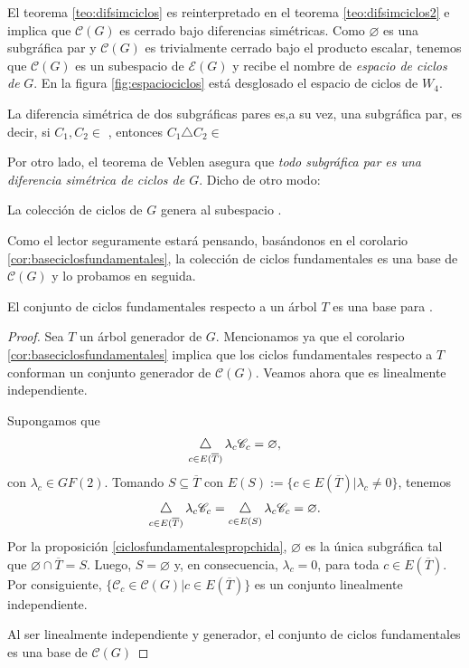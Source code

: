 El teorema \ref{teo:difsimciclos} es reinterpretado en el teorema \ref{teo:difsimciclos2} e implica que $\mathcal{C}(G)$ es cerrado bajo diferencias simétricas. Como $\varnothing$ es una subgráfica par y $\mathcal{C}(G)$ es trivialmente cerrado bajo el producto escalar, tenemos que $\mathcal{C}(G)$ es un subespacio de $\mathcal{E}(G)$ y recibe el nombre de \textit{espacio de ciclos de} $G$. En la figura \ref{fig:espaciociclos} está desglosado el espacio de ciclos de $W_{4}$.

\begin{teo} \label{teo:difsimciclos2}
La diferencia simétrica de dos subgráficas pares es,a su vez, una subgráfica par, es decir, si $C_{1},C_{2} \in$ \cyclet, entonces $C_{1} \triangle C_{2}\in$ \cyclet
\end{teo}

Por otro lado, el teorema de Veblen asegura que \textit{todo subgráfica par es una diferencia simétrica de ciclos de $G$}. Dicho de otro modo:

\begin{teo}
La colección de ciclos de $G$ genera al subespacio \cyclet.
\end{teo}

Como el lector seguramente estará pensando, basándonos en el  corolario \ref{cor:baseciclosfundamentales}, la colección de ciclos fundamentales es una base de $\mathcal{C}(G)$ y lo probamos en seguida.

\begin{teo}
El conjunto de ciclos fundamentales respecto a un árbol $T$ es una base para \cyclet.
 \end{teo}
 
 \begin{proof} Sea $T$ un árbol generador de $G$.
 Mencionamos ya que el corolario \ref{cor:baseciclosfundamentales} implica que los ciclos fundamentales respecto a $T$ conforman un conjunto generador de $\mathcal{C}(G)$. Veamos ahora que es linealmente independiente.
 
Supongamos que $$\difsym_{c \in E(\overline{T})} \lambda_{c}\mathscr{C}_{c} = \varnothing,$$ con $\lambda_{c} \in GF(2)$.  Tomando $S\subseteq \overline{T}$ con $E(S):=\{c \in E(\overline{T}) | \lambda_{c} \neq 0\}$, tenemos
$$
\difsym_{c \in E(\overline{T})} \lambda_{c}\mathscr{C}_{c} = \difsym_{c \in E(S)} \lambda_{c}\mathscr{C}_{c}= \varnothing.
$$
Por la proposición \ref{ciclosfundamentalespropchida},  $\varnothing$ es la única subgráfica tal que $\varnothing \cap \overline{T} = S$. Luego, $S = \varnothing$ y, en consecuencia, $\lambda_{c}=0$, para toda $c \in E(\overline{T})$. Por consiguiente, $\{\mathscr{C}_{c} \in \mathcal{C}(G) | c \in E(\overline{T})\}$ es un conjunto linealmente independiente. 

Al ser linealmente independiente y generador, el conjunto de ciclos fundamentales es una base de $\mathcal{C}(G)$

 \end{proof}

